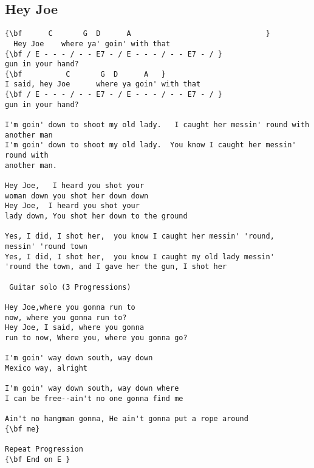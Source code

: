 \documentclass[a4paper]{article}
\begin{document}
\subsection{Hey Joe}
\begin{Verbatim}[commandchars=\\\{\}]
{\bf 	  C       G  D      A                               }
  Hey Joe    where ya' goin' with that  
{\bf / E - - - / - - E7 - / E - - - / - - E7 - / }
gun in your hand? 
{\bf          C       G  D      A   }
I said, hey Joe      where ya goin' with that  
{\bf / E - - - / - - E7 - / E - - - / - - E7 - / }
gun in your hand?  

I'm goin' down to shoot my old lady.   I caught her messin' round with  
another man  
I'm goin' down to shoot my old lady.  You know I caught her messin' round with  
another man. 

Hey Joe,   I heard you shot your 
woman down you shot her down down 
Hey Joe,  I heard you shot your  
lady down, You shot her down to the ground 

Yes, I did, I shot her,  you know I caught her messin' 'round,  
messin' 'round town 
Yes, I did, I shot her,  you know I caught my old lady messin'  
'round the town, and I gave her the gun, I shot her 

 Guitar solo (3 Progressions) 

Hey Joe,where you gonna run to  
now, where you gonna run to? 
Hey Joe, I said, where you gonna  
run to now, Where you, where you gonna go? 

I'm goin' way down south, way down  
Mexico way, alright 

I'm goin' way down south, way down where  
I can be free--ain't no one gonna find me 

Ain't no hangman gonna, He ain't gonna put a rope around  
{\bf me}

Repeat Progression 
{\bf End on E }

\end{Verbatim}
\newpage
\end{document}
